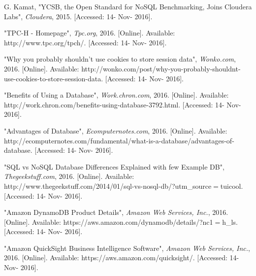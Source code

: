 \documentclass[10pt,draftclsnofoot,onecolumn,journal,compsoc]{IEEEtran}
\begin{document}
    \newpage
     \begin{thebibliography}{8}
        
        G. Kamat, "YCSB, the Open Standard for NoSQL Benchmarking, Joins Cloudera Labs", \textit{Cloudera}, 2015. [Accessed: 14- Nov- 2016].
        
        "TPC-H - Homepage", \textit{Tpc.org}, 2016. [Online]. Available: http://www.tpc.org/tpch/. [Accessed: 14- Nov- 2016].
        
        "Why you probably shouldn't use cookies to store session data", \textit{Wonko.com}, 2016. [Online]. Available: http://wonko.com/post/why-you-probably-shouldnt-use-cookies-to-store-session-data. [Accessed: 14- Nov- 2016].
        
        "Benefits of Using a Database", \textit{Work.chron.com}, 2016. [Online]. Available: http://work.chron.com/benefits-using-database-3792.html. [Accessed: 14- Nov- 2016].
        
        "Advantages of Database", \textit{Ecomputernotes.com}, 2016. [Online]. Available: http://ecomputernotes.com/fundamental/what-is-a-database/advantages-of-database. [Accessed: 14- Nov- 2016].
        
        "SQL vs NoSQL Database Differences Explained with few Example DB", \textit{Thegeekstuff.com}, 2016. [Online]. Available: http://www.thegeekstuff.com/2014/01/sql-vs-nosql-db/?utm\_source$=$tuicool. [Accessed: 14- Nov- 2016].
        
        "Amazon DynamoDB Product Details", \textit{Amazon Web Services, Inc.}, 2016. [Online]. Available: https://aws.amazon.com/dynamodb/details/?nc1{$=$}h\_ls. [Accessed: 14- Nov- 2016].
        
        "Amazon QuickSight Business Intelligence Software", \textit{Amazon Web Services, Inc.}, 2016. [Online]. Available: https://aws.amazon.com/quicksight/. [Accessed: 14- Nov- 2016].
  
    \end{thebibliography}
        
\end{document}
